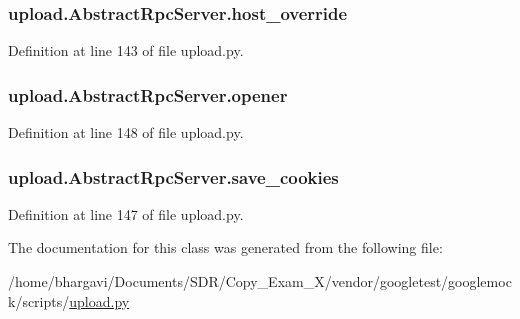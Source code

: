 \subsubsection[{\texorpdfstring{host\+\_\+override}{host_override}}]{\setlength{\rightskip}{0pt plus 5cm}upload.\+Abstract\+Rpc\+Server.\+host\+\_\+override}\hypertarget{classupload_1_1_abstract_rpc_server_a783a4a7e4ffb776a57a3f267300a213b}{}\label{classupload_1_1_abstract_rpc_server_a783a4a7e4ffb776a57a3f267300a213b}


Definition at line 143 of file upload.\+py.

\subsubsection[{\texorpdfstring{opener}{opener}}]{\setlength{\rightskip}{0pt plus 5cm}upload.\+Abstract\+Rpc\+Server.\+opener}\hypertarget{classupload_1_1_abstract_rpc_server_aa931446476e0e86f3ade7fef0a0aea5a}{}\label{classupload_1_1_abstract_rpc_server_aa931446476e0e86f3ade7fef0a0aea5a}


Definition at line 148 of file upload.\+py.

\subsubsection[{\texorpdfstring{save\+\_\+cookies}{save_cookies}}]{\setlength{\rightskip}{0pt plus 5cm}upload.\+Abstract\+Rpc\+Server.\+save\+\_\+cookies}\hypertarget{classupload_1_1_abstract_rpc_server_affe342205c4647d41b127f5a5634858b}{}\label{classupload_1_1_abstract_rpc_server_affe342205c4647d41b127f5a5634858b}


Definition at line 147 of file upload.\+py.



The documentation for this class was generated from the following file\+:\begin{DoxyCompactItemize}
\item 
/home/bhargavi/\+Documents/\+S\+D\+R/\+Copy\+\_\+\+Exam\+\_\+X/vendor/googletest/googlemock/scripts/\hyperlink{googlemock_2scripts_2upload_8py}{upload.\+py}\end{DoxyCompactItemize}
